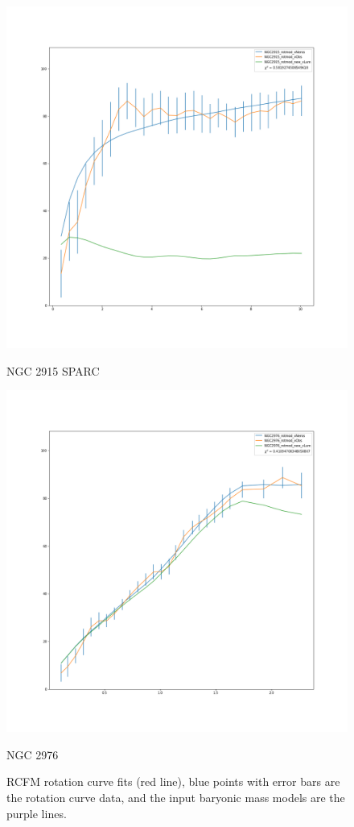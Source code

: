\documentclass[reprint,%
 amsmath,amssymb,
 aps,
]{revtex4-1}
\begin{document}
 
\begin{figure} 
\centering
\begin{minipage}{0.5\textwidth}
\includegraphics[width=0.95\linewidth]{figures/NGC2915_rotmod_XueSofue.png}
\caption{NGC 2915 SPARC\cite{2016Lelli}}
\label{fig:2915}
\end{minipage}
\begin{minipage}{0.5\textwidth}
\includegraphics[width=0.95\linewidth]{figures/NGC2976_rotmod_XueSofue.png}
\caption{NGC 2976}
\label{fig:2976}
\end{minipage}
\caption{RCFM rotation curve fits (red line), blue points with error bars are the rotation curve data, and the input baryonic mass models are the purple lines. }
\end{figure}
  
\end{document}
